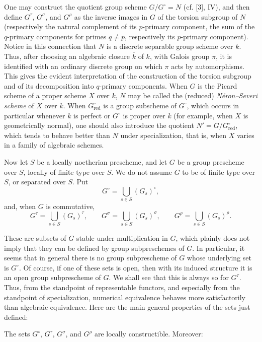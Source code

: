  One may construct the quotient group scheme
$G/G^\circ=N$ (cf. [3], IV), and then define $G^\tau$, $G^\sigma$, and
$G^\rho$ as the inverse images in $G$ of the torsion subgroup of $N$
(respectively the natural complement of its $p$-primary component, the sum of
the $q$-primary components for primes $q\neq p$, respectively its $p$-primary
component).
Notice in this connection that $N$ is a discrete separable group scheme over
$k$. Thus, after choosing an algebraic closure $\overline k$ of $k$, with
Galois group $\pi$, it is identified with an ordinary discrete group on which
$\pi$ acts by automorphisms. This gives the evident interpretation of the
construction of the torsion subgroup and of its decomposition into
$q$-primary components. When $G$ is the Picard scheme of a proper scheme $X$
over $k$, $N$ may be called the (reduced) \emph{Néron--Severi scheme} of $X$
over $k$. When $G^\circ_{\mathrm{red}}$ is a group subscheme of $G^\circ$,
which occurs in particular whenever $k$ is perfect or $G^\circ$ is proper over
$k$ (for example, when $X$ is geometrically normal), one should also introduce
the quotient $N'=G/G^\circ_{\mathrm{red}}$, which tends to behave better than
$N$ under specialization, that is, when $X$ varies in a family of algebraic
schemes.

Now let $S$ be a locally noetherian prescheme, and let $G$ be a group
prescheme over $S$, locally of finite type over $S$. We do not assume $G$ to
be of finite type over $S$, or separated over $S$. Put
\[
G^\circ=\bigcup_{s\in S}(G_s)^\circ,
\]
and, when $G$ is commutative,
\[
G^\tau=\bigcup_{s\in S}(G_s)^\tau,
\qquad
G^\sigma=\bigcup_{s\in S}(G_s)^\sigma,
\qquad
G^\rho=\bigcup_{s\in S}(G_s)^\rho.
\]

These are subsets of $G$ stable under multiplication in $G$, which plainly
does not imply that they can be defined by group subpreschemes of $G$. In
particular, it seems that in general there is no group subprescheme of $G$
whose underlying set is $G^\circ$. Of course, if one of these sets is open,
then with its induced structure it is an open group subprescheme of $G$. We
shall see that this is always so for $G^\tau$. Thus, from the standpoint of
representable functors, and especially from the standpoint of specialization,
numerical equivalence behaves more satisfactorily than algebraic equivalence.
Here are the main general properties of the sets just defined:

 The sets $G^\circ$, $G^\tau$, $G^\sigma$, and $G^\rho$
are locally constructible. Moreover:

